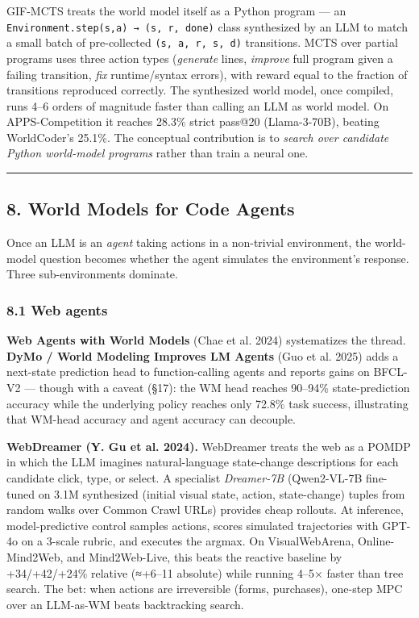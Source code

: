 \documentclass{article}
\begin{document}
GIF-MCTS treats the world model itself as a Python program --- an
\texttt{Environment.step(s,a)\ →\ (s\textquotesingle{},\ r,\ done)}
class synthesized by an LLM to match a small batch of pre-collected
\texttt{(s,\ a,\ r,\ s\textquotesingle{},\ d)} transitions. MCTS over
partial programs uses three action types (\emph{generate} lines,
\emph{improve} full program given a failing transition, \emph{fix}
runtime/syntax errors), with reward equal to the fraction of transitions
reproduced correctly. The synthesized world model, once compiled, runs
4--6 orders of magnitude faster than calling an LLM as world model. On
APPS-Competition it reaches 28.3\% strict pass@20 (Llama-3-70B), beating
WorldCoder's 25.1\%. The conceptual contribution is to \emph{search over
candidate Python world-model programs} rather than train a neural one.

\begin{center}\rule{0.5\linewidth}{0.5pt}\end{center}

\hypertarget{world-models-for-code-agents}{%
\subsection{8. World Models for Code
Agents}\label{world-models-for-code-agents}}

Once an LLM is an \emph{agent} taking actions in a non-trivial
environment, the world-model question becomes whether the agent
simulates the environment's response. Three sub-environments dominate.

\hypertarget{web-agents}{%
\subsubsection{8.1 Web agents}\label{web-agents}}

\textbf{Web Agents with World Models} (Chae et al. 2024) systematizes
the thread. \textbf{DyMo / World Modeling Improves LM Agents} (Guo et
al. 2025) adds a next-state prediction head to function-calling agents
and reports gains on BFCL-V2 --- though with a caveat (§17): the WM head
reaches 90--94\% state-prediction accuracy while the underlying policy
reaches only 72.8\% task success, illustrating that WM-head accuracy and
agent accuracy can decouple.

\textbf{WebDreamer (Y. Gu et al. 2024).} WebDreamer treats the web as a
POMDP in which the LLM imagines natural-language state-change
descriptions for each candidate click, type, or select. A specialist
\emph{Dreamer-7B} (Qwen2-VL-7B fine-tuned on 3.1M synthesized (initial
visual state, action, state-change) tuples from random walks over Common
Crawl URLs) provides cheap rollouts. At inference, model-predictive
control samples actions, scores simulated trajectories with GPT-4o on a
3-scale rubric, and executes the argmax. On VisualWebArena,
Online-Mind2Web, and Mind2Web-Live, this beats the reactive baseline by
+34/+42/+24\% relative (≈+6--11 absolute) while running 4--5× faster
than tree search. The bet: when actions are irreversible (forms,
purchases), one-step MPC over an LLM-as-WM beats backtracking search.
\end{document}
